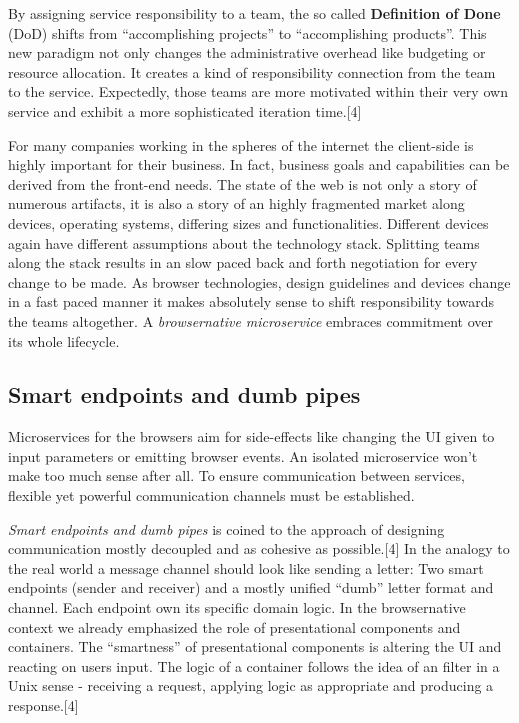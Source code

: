 \documentclass[]{assets/latex/ieee}
\begin{document}
By assigning service responsibility to a team, the so called
\textbf{Definition of Done} (DoD) shifts from ``accomplishing projects''
to ``accomplishing products''. This new paradigm not only changes the
administrative overhead like budgeting or resource allocation. It
creates a kind of responsibility connection from the team to the
service. Expectedly, those teams are more motivated within their very
own service and exhibit a more sophisticated iteration time.{[}4{]}

For many companies working in the spheres of the internet the
client-side is highly important for their business. In fact, business
goals and capabilities can be derived from the front-end needs. The
state of the web is not only a story of numerous artifacts, it is also a
story of an highly fragmented market along devices, operating systems,
differing sizes and functionalities. Different devices again have
different assumptions about the technology stack. Splitting teams along
the stack results in an slow paced back and forth negotiation for every
change to be made. As browser technologies, design guidelines and
devices change in a fast paced manner it makes absolutely sense to shift
responsibility towards the teams altogether. A \emph{browsernative
microservice} embraces commitment over its whole lifecycle.

\subsection{Smart endpoints and dumb
pipes}\label{smart-endpoints-and-dumb-pipes}

Microservices for the browsers aim for side-effects like changing the UI
given to input parameters or emitting browser events. An isolated
microservice won't make too much sense after all. To ensure
communication between services, flexible yet powerful communication
channels must be established.

\emph{Smart endpoints and dumb pipes} is coined to the approach of
designing communication mostly decoupled and as cohesive as
possible.{[}4{]} In the analogy to the real world a message channel
should look like sending a letter: Two smart endpoints (sender and
receiver) and a mostly unified ``dumb'' letter format and channel. Each
endpoint own its specific domain logic. In the browsernative context we
already emphasized the role of presentational components and containers.
The ``smartness'' of presentational components is altering the UI and
reacting on users input. The logic of a container follows the idea of an
filter in a Unix sense - receiving a request, applying logic as
appropriate and producing a response.{[}4{]}
\end{document}
